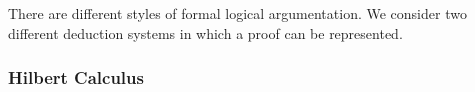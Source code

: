 





            There are different styles of formal logical argumentation. We consider two different deduction systems in which a proof can be represented.
            


                

            \subsubsection{Hilbert Calculus}
                \label{sec:hilbert-calculus}

